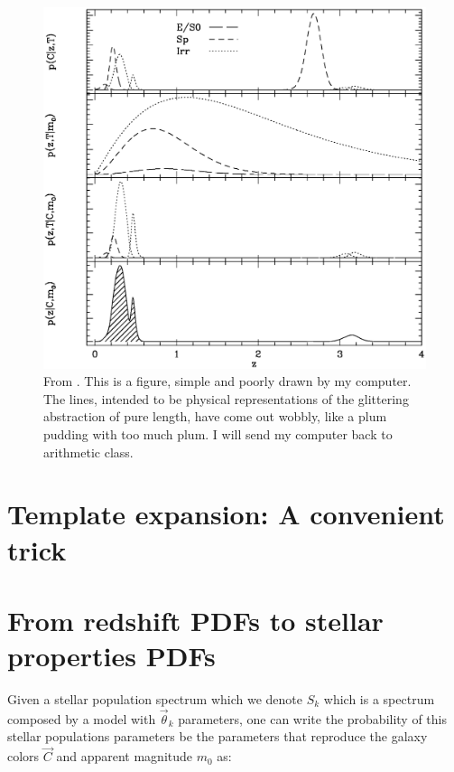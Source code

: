 \documentclass[9pt]{memoir}
\begin{document}
\begin{figure}
\begin{adjustwidth*}{1in}{0pt}
\centering
\includegraphics[width=1.3\textwidth]{figures/figpeaks.eps}
\end{adjustwidth*}
\caption{From \cite{Benitez.2000a}. This is a figure, simple and poorly drawn by my computer. The lines, intended to be physical representations of the glittering abstraction of pure length, have come out wobbly, like a plum pudding with too much plum. I will send my computer back to arithmetic class.}
\label{fig:prior}
\end{figure}



\section{Template expansion: A convenient trick}
\label{sec:TemplateExpansion}


\section{From redshift PDFs to stellar properties PDFs}
\label{sec:fit}

Given a stellar population spectrum which we denote $S_k$ which is a spectrum composed by a model with $\vec{\theta}_k$ parameters, one can write the probability of this stellar populations parameters be the parameters that reproduce the galaxy colors $\vec{C}$ and apparent magnitude $m_0$ as:
\end{document}
